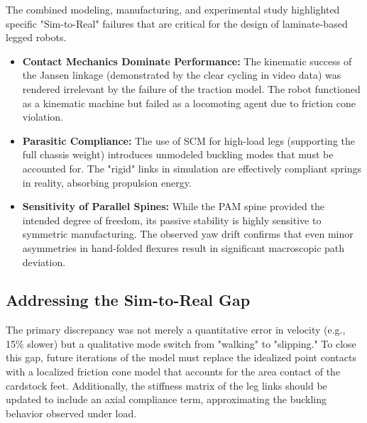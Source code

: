 \documentclass[11pt, a4paper]{article}
\begin{document}
The combined modeling, manufacturing, and experimental study highlighted specific "Sim-to-Real" failures that are critical for the design of laminate-based legged robots.
\begin{itemize}
    \item \textbf{Contact Mechanics Dominate Performance:} The kinematic success of the Jansen linkage (demonstrated by the clear cycling in video data) was rendered irrelevant by the failure of the traction model. The robot functioned as a kinematic machine but failed as a locomoting agent due to friction cone violation.
    \item \textbf{Parasitic Compliance:} The use of SCM for high-load legs (supporting the full chassis weight) introduces unmodeled buckling modes that must be accounted for. The "rigid" links in simulation are effectively compliant springs in reality, absorbing propulsion energy.
    \item \textbf{Sensitivity of Parallel Spines:} While the PAM spine provided the intended degree of freedom, its passive stability is highly sensitive to symmetric manufacturing. The observed yaw drift confirms that even minor asymmetries in hand-folded flexures result in significant macroscopic path deviation.
\end{itemize}

\subsection{Addressing the Sim-to-Real Gap}
The primary discrepancy was not merely a quantitative error in velocity (e.g., 15\% slower) but a qualitative mode switch from "walking" to "slipping." To close this gap, future iterations of the model must replace the idealized point contacts with a localized friction cone model that accounts for the area contact of the cardstock feet. Additionally, the stiffness matrix of the leg links should be updated to include an axial compliance term, approximating the buckling behavior observed under load.
\end{document}
